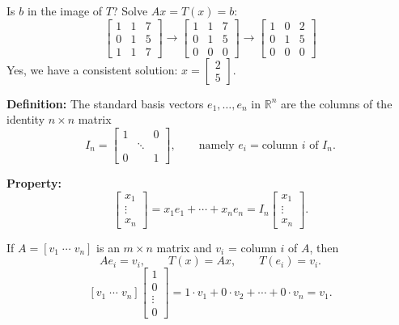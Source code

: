\documentclass{article}
\begin{document}
Is $b$ in the image of $T$? Solve $Ax = T(x) = b$:
\[
\left[ \begin{array}{cc|c} 1 & 1 & 7 \\ 0 & 1 & 5 \\ 1 & 1 & 7 \end{array} \right]
\to
\left[ \begin{array}{cc|c} 1 & 1 & 7 \\ 0 & 1 & 5 \\ 0 & 0 & 0 \end{array} \right]
\to
\left[ \begin{array}{cc|c} 1 & 0 & 2 \\ 0 & 1 & 5 \\ 0 & 0 & 0 \end{array} \right]
\]
Yes, we have a consistent solution: $x = \begin{bmatrix} 2 \\ 5 \end{bmatrix}$.

\newpage

\textbf{Definition:} The standard basis vectors $e_1, \ldots, e_n$ in $\mathbb{R}^n$ are the columns of the identity $n \times n$ matrix
\[
I_n = \begin{bmatrix} 1 & & 0 \\ & \ddots & \\ 0 & & 1 \end{bmatrix}, \qquad \text{namely } e_i = \text{column } i \text{ of } I_n.
\]

\medskip

\textbf{Property:}
\[
\begin{bmatrix} x_1 \\ \vdots \\ x_n \end{bmatrix} = x_1 e_1 + \cdots + x_n e_n = I_n \begin{bmatrix} x_1 \\ \vdots \\ x_n \end{bmatrix}.
\]

\bigskip

If $A = [v_1 \; \cdots \; v_n]$ is an $m \times n$ matrix and $v_i$ = column $i$ of $A$, then
\[
Ae_i = v_i, \qquad T(x) = Ax, \qquad T(e_i) = v_i.
\]
\[
[v_1 \; \cdots \; v_n] \begin{bmatrix} 1 \\ 0 \\ \vdots \\ 0 \end{bmatrix} = 1 \cdot v_1 + 0 \cdot v_2 + \cdots + 0 \cdot v_n = v_1.
\]
\end{document}
